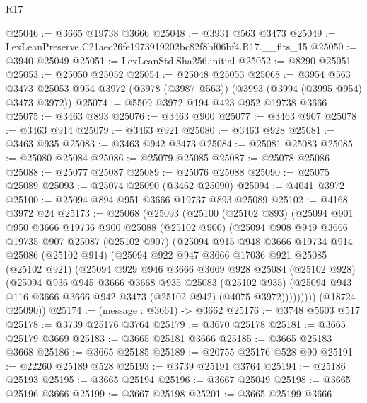 \begin{lexlean}{R17}
\begin{coremodule}
@25046 := @3665 @19738 @3666
@25048 := @3931 @563 @3473
@25049 := LexLeanPreserve.C21aec26fe1973919202bc82f8bf06bf4.R17.__fits_15
@25050 := @3940 @25049
@25051 := LexLeanStd.Sha256.initial
@25052 := @8290 @25051
@25053 := @25050 @25052
@25054 := @25048 @25053
@25068 := @3954
    @563
    @3473
    @25053
    @954
    @3972
    (@3978 (@3987 @563))
    (@3993 (@3994 (@3995 @954) @3473 @3972))
@25074 := @5509 @3972 @194 @423 @952 @19738 @3666
@25075 := @3463 @893
@25076 := @3463 @900
@25077 := @3463 @907
@25078 := @3463 @914
@25079 := @3463 @921
@25080 := @3463 @928
@25081 := @3463 @935
@25083 := @3463 @942 @3473
@25084 := @25081 @25083
@25085 := @25080 @25084
@25086 := @25079 @25085
@25087 := @25078 @25086
@25088 := @25077 @25087
@25089 := @25076 @25088
@25090 := @25075 @25089
@25093 := @25074 @25090 (@3462 @25090)
@25094 := @4041 @3972
@25100 := @25094 @894 @951 @3666 @19737 @893 @25089
@25102 := @4168 @3972 @24
@25173 := @25068
    (@25093
      (@25100
        (@25102 @893)
        (@25094
          @901
          @950
          @3666
          @19736
          @900
          @25088
          (@25102 @900)
          (@25094
            @908
            @949
            @3666
            @19735
            @907
            @25087
            (@25102 @907)
            (@25094
              @915
              @948
              @3666
              @19734
              @914
              @25086
              (@25102 @914)
              (@25094
                @922
                @947
                @3666
                @17036
                @921
                @25085
                (@25102 @921)
                (@25094
                  @929
                  @946
                  @3666
                  @3669
                  @928
                  @25084
                  (@25102 @928)
                  (@25094
                    @936
                    @945
                    @3666
                    @3668
                    @935
                    @25083
                    (@25102 @935)
                    (@25094 @943 @116 @3666 @3666 @942 @3473 (@25102 @942) (@4075 @3972)))))))))
      (@18724 @25090))
@25174 := (message : @3661) -> @3662
@25176 := @3748 @5603 @517
@25178 := @3739 @25176 @3764
@25179 := @3670 @25178
@25181 := @3665 @25179 @3669
@25183 := @3665 @25181 @3666
@25185 := @3665 @25183 @3668
@25186 := @3665 @25185
@25189 := @20755 @25176 @528 @90
@25191 := @22260 @25189 @528
@25193 := @3739 @25191 @3764
@25194 := @25186 @25193
@25195 := @3665 @25194
@25196 := @3667 @25049
@25198 := @3665 @25196 @3666
@25199 := @3667 @25198
@25201 := @3665 @25199 @3666

\end{coremodule}
\end{lexlean}
